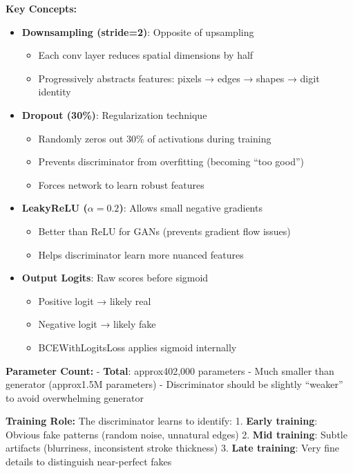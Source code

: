 \documentclass[11pt]{article}
\providecommand{\tightlist}{%
      \setlength{\itemsep}{0pt}\setlength{\parskip}{0pt}}
\begin{document}
\textbf{Key Concepts:}

\begin{itemize}
\tightlist
\item
  \textbf{Downsampling (stride=2)}: Opposite of upsampling

  \begin{itemize}
  \tightlist
  \item
    Each conv layer reduces spatial dimensions by half
  \item
    Progressively abstracts features: pixels → edges → shapes → digit
    identity
  \end{itemize}
\item
  \textbf{Dropout (30\%)}: Regularization technique

  \begin{itemize}
  \tightlist
  \item
    Randomly zeros out 30\% of activations during training
  \item
    Prevents discriminator from overfitting (becoming ``too good'')
  \item
    Forces network to learn robust features
  \end{itemize}
\item
  \textbf{LeakyReLU (\(\alpha = 0.2\))}: Allows small negative gradients

  \begin{itemize}
  \tightlist
  \item
    Better than ReLU for GANs (prevents gradient flow issues)
  \item
    Helps discriminator learn more nuanced features
  \end{itemize}
\item
  \textbf{Output Logits}: Raw scores before sigmoid

  \begin{itemize}
  \tightlist
  \item
    Positive logit → likely real
  \item
    Negative logit → likely fake
  \item
    BCEWithLogitsLoss applies sigmoid internally
  \end{itemize}
\end{itemize}

\textbf{Parameter Count:} - \textbf{Total}: approx402,000 parameters -
Much smaller than generator (approx1.5M parameters) - Discriminator
should be slightly ``weaker'' to avoid overwhelming generator

\textbf{Training Role:} The discriminator learns to identify: 1.
\textbf{Early training}: Obvious fake patterns (random noise, unnatural
edges) 2. \textbf{Mid training}: Subtle artifacts (blurriness,
inconsistent stroke thickness) 3. \textbf{Late training}: Very fine
details to distinguish near-perfect fakes
\end{document}
